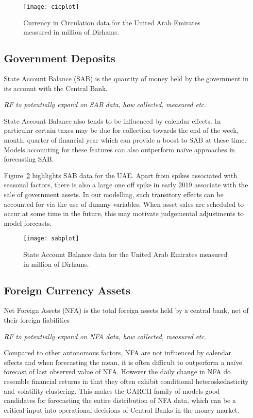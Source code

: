 \begin{figure}[!h] \centering \texttt{[image: cicplot]}
    \caption{Currency  in  Circulation  data  for  the  United  Arab  Emirates
measured in million of Dirhams.}
    \label{fig:cicdata}
\end{figure}

\subsection{Government Deposits}

State Account Balance (SAB) is the quantity of money held by the government in
its account with the Central Bank.

\textit{\color{blue}  RF to  potentially expand  on SAB  data, how  collected,
measured etc.}

State Account  Balance also  tends to  be influenced  by calendar  effects. In
particular certain  taxes may  be due  for collection towards  the end  of the
week, month,  quarter of financial  year which can provide  a boost to  SAB at
these time. Models  accounting for these features can  also outperform na\"ive
approaches in forecasting SAB.

Figure~\ref{fig:sabdata} highlights  SAB data for  the UAE. Apart  from spikes
associated with seasonal factors, there is also a large one off spike in early
2019 associate  with the sale  of government  assets.  In our  modelling, such
transitory effects can  be accounted for via the use  of dummy variables. When
asset  sales are  scheduled to  occur at  some time  in the  future, this  may
motivate judgemental adjustments to model forecasts.

\begin{figure}[!h] \centering \texttt{[image: sabplot]}
    \caption{State Account Balance data for  the United Arab Emirates measured
in million of Dirhams.}
    \label{fig:sabdata}
\end{figure}

\subsection{Foreign Currency Assets}

Net Foreign Assets (NFA)  is the total foreign assets held  by a central bank,
net of their foreign liabilities

\textit{\color{blue}  RF to  potentially expand  on NFA  data, how  collected,
measured etc.}

Compared  to other  autonomous factors,  NFA  are not  influenced by  calendar
effects and when  forecasting the mean, it is often  difficult to outperform a
na\"ive forecast  of last observed value  of NFA. However the  daily change in
NFA  do resemble  financial returns  in  that they  often exhibit  conditional
heteroskedasticity and volatility  clustering. This makes the  GARCH family of
models good  candidates for forecasting  the entire distribution of  NFA data,
which can be  a critical input into operational decisions  of Central Banks in
the money market.

